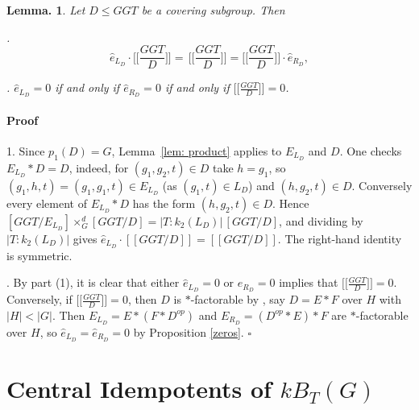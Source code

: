 \documentclass[12pt]{article}
\theoremstyle{change}
\newtheorem{lem}[theorem]{Lemma.}
\newenvironment{proof}{\paragraph{Proof}}{\hfill$\square$}
\renewcommand{\le}{\leqslant} %
\newcommand{\1}{{\bf 1}}
\begin{document}
\begin{lem}\label{lem: reduced-invariants}
Let $D\le GGT$ be a covering subgroup. Then

\smallskip

. 
\begin{equation*}
\label{eq: ipottimeselement}
\widehat{e}_{L_D}\cdot\Big[\Big[\frac{GGT}{D}\Big]\Big] =\,\Big[\Big[\frac{GGT}{D}\Big]\Big] =\Big[\Big[\frac{GGT}{D}\Big]\Big]\cdot\widehat{e}_{R_D},
\end{equation*}

\smallskip

. $\widehat e_{L_D} = 0$ if and only if $\widehat e_{R_D} = 0$ if and only if $\Big[\Big[\frac{GGT}{D}\Big]\Big] = 0$.
\end{lem}
\begin{proof} 1. Since $p_1(D)=G$, Lemma~\ref{lem: product} applies to $E_{L_D}$ and $D$. One checks
$E_{L_D}\ast D = D$, indeed, for $(g_1,g_2,t)\in D$ take $h=g_1$, so $(g_1,h,t)=(g_1,g_1,t)\in E_{L_D}$
(as $(g_1,t)\in L_D$) and $(h,g_2,t)\in D$. Conversely every element of $E_{L_D}\ast D$ has the
form $(h,g_2,t)\in D$. Hence
$[GGT/E_{L_D}]\times_G^d[GGT/D]=|T:k_2(L_D)|\,[GGT/D]$, and dividing by $|T:k_2(L_D)|$ gives
$\widehat e_{L_D}\cdot[[GGT/D]]=[[GGT/D]]$. The right-hand identity is symmetric.

    \smallskip 

. By part (1), it is clear that either $\widehat e_{L_D} = 0$ or $\widehat e_{R_D} = 0$ implies that $\Big[\Big[\frac{GGT}{D}\Big]\Big] = 0$. Conversely, if $\Big[\Big[\frac{GGT}{D}\Big]\Big] = 0$, then $D$ is $\ast$-factorable by \cite[Lemma 3.2]{R1}, say $D=E\ast F$ over $H$ with $|H|<|G|$. Then $E_{L_D} = E\ast (F\ast D^{op})$ and $E_{R_D} = (D^{op} \ast E) \ast F$ are $\ast$-factorable over $H$, so $\widehat e_{L_D} = \widehat e_{R_D} = 0$ by Proposition \ref{zeros}.
\end{proof}


\section{Central Idempotents of \(\widehat{kB_T}(G)\)}

\end{document}
